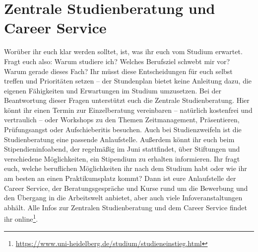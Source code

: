 \section[Zentrale Studienberatung und Career Service]{Zentrale Studienberatung und \\Career Service}
Worüber ihr euch klar werden solltet, ist, was ihr euch vom Studium erwartet. Fragt euch also: Warum studiere ich? Welches Berufsziel schwebt mir vor? Warum gerade dieses Fach? Ihr müsst diese Entscheidungen für euch selbst treffen und Prioritäten setzen -- der Stundenplan bietet keine Anleitung dazu, die eigenen Fähigkeiten und Erwartungen im Studium umzusetzen. Bei der Beantwortung dieser Fragen unterstützt euch die Zentrale Studienberatung. Hier könnt ihr einen Termin zur Einzelberatung vereinbaren -- natürlich kostenfrei und vertraulich -- oder Workshops zu den Themen Zeitmanagement, Präsentieren, Prüfungsangst oder Aufschieberitis besuchen. Auch bei Studienzweifeln ist die Studienberatung eine passende Anlaufstelle. Außerdem könnt ihr euch beim Stipendieninfoabend, der regelmäßig im Juni stattfindet, über Stiftungen und verschiedene Möglichkeiten, ein Stipendium zu erhalten informieren.
Ihr fragt euch, welche beruflichen Möglichkeiten ihr nach dem Studium habt oder wie ihr am besten an einen Praktikumsplatz kommt? Dann ist eure Anlaufstelle der Career Service, der Beratungsgespräche und Kurse rund um die Bewerbung und den Übergang in die Arbeitswelt anbietet, aber auch viele Infoveranstaltungen abhält. 
Alle Infos zur Zentralen Studienberatung und dem Career Service findet ihr online\footnote{\url{https://www.uni-heidelberg.de/studium/studieneinstieg.html}}.
